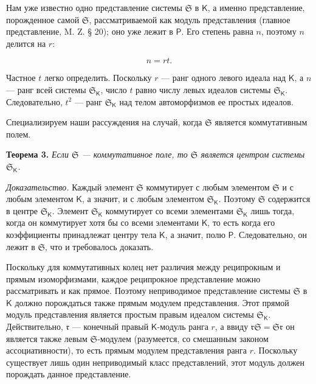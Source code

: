 \documentclass[11pt]{article}
\begin{document}
Нам уже известно одно представление системы \(\mathfrak S\) в \(\mathsf K\), а именно представление, порожденное самой \(\mathfrak S\), рассматриваемой как модуль представления (главное представление, M. Z. § 20); оно уже лежит в \(\mathsf P\). Его степень равна \(n\), поэтому \(n\) делится на \(r\):

\[
n=rt.
\]

Частное \(t\) легко определить. Поскольку \(r\) --- ранг одного левого идеала над \(\mathsf K\), а \(n\) --- ранг всей системы \(\mathfrak S_{\mathsf K}\), число \(t\) равно числу левых идеалов системы \(\mathfrak S_{\mathsf K}\). Следовательно, \(t^2\) --- ранг \(\mathfrak S_{\mathsf K}\) над телом автоморфизмов ее простых идеалов.

Специализируем наши рассуждения на случай, когда \(\mathfrak S\) является коммутативным полем.

\textbf{Теорема 3.} \emph{Если \(\mathfrak S\) --- коммутативное поле, то \(\mathfrak S\) является центром системы \(\mathfrak S_{\mathsf K}\).}

\emph{Доказательство.} Каждый элемент \(\mathfrak S\) коммутирует с любым элементом \(\mathfrak S\) и с любым элементом \(\mathsf K\), а значит, и с любым элементом \(\mathfrak S_{\mathsf K}\). Поэтому \(\mathfrak S\) содержится в центре \(\mathfrak S_{\mathsf K}\). Элемент \(\mathfrak S_{\mathsf K}\) коммутирует со всеми элементами \(\mathfrak S_{\mathsf K}\) лишь тогда, когда он коммутирует хотя бы со всеми элементами \(\mathsf K\), то есть когда его коэффициенты принадлежат центру тела \(\mathsf K\), а значит, полю \(\mathsf P\). Следовательно, он лежит в \(\mathfrak S\), что и требовалось доказать.

Поскольку для коммутативных колец нет различия между реципрокным и прямым изоморфизмами, каждое реципрокное представление можно рассматривать и как прямое. Поэтому неприводимое представление системы \(\mathfrak S\) в \(\mathsf K\) должно порождаться также прямым модулем представления. Этот прямой модуль представления является простым правым идеалом системы \(\mathfrak S_{\mathsf K}\). Действительно, \(\mathfrak r\) --- конечный правый \(\mathsf K\)-модуль ранга \(r\), а ввиду \(\mathfrak r\mathfrak S=\mathfrak S\mathfrak r\) он является также левым \(\mathfrak S\)-модулем (разумеется, со смешанным законом ассоциативности), то есть прямым модулем представления ранга \(r\). Поскольку существует лишь один неприводимый класс представлений, этот модуль должен порождать данное представление.

\end{document}
